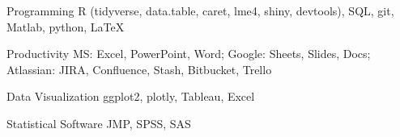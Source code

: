 

\begin{cvskills}

  \cvskill
    {Programming} %
    {R (tidyverse, data.table, caret, lme4, shiny, devtools), SQL, git, Matlab, python, \LaTeX} %

  \cvskill
    {Productivity} %
    {MS: Excel, PowerPoint, Word; Google: Sheets, Slides, Docs; Atlassian: JIRA, Confluence, Stash, Bitbucket, Trello} %

  \cvskill
    {Data Visualization} %
    {ggplot2, plotly, Tableau, Excel} %

  \cvskill
    {Statistical Software} %
    {JMP, SPSS, SAS} %

\end{cvskills}
